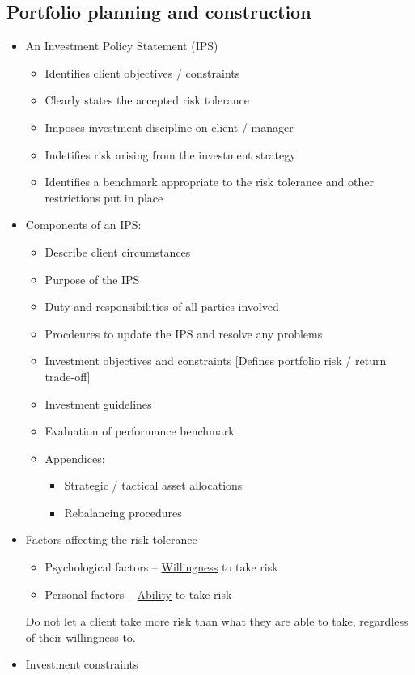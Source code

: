 \documentclass[../notes_compiled.tex]{subfiles}
\begin{document}
\subsection{Portfolio planning and construction}
\begin{itemize}
\item An Investment Policy Statement (IPS)
\begin{itemize}
\item Identifies client objectives / constraints
\item Clearly states the accepted risk tolerance
\item Imposes investment discipline on client / manager
\item Indetifies risk arising from the investment strategy
\item Identifies a benchmark appropriate to the risk tolerance and other restrictions put in place
\end{itemize}
\item Components of an IPS:
\begin{itemize}
\item Describe client circumstances
\item Purpose of the IPS
\item Duty and responsibilities of all parties involved
\item Procdeures to update the IPS and resolve any problems
\item Investment objectives and constraints [Defines portfolio risk / return trade-off]
\item Investment guidelines
\item Evaluation of performance benchmark
\item Appendices:
\begin{itemize}
\item Strategic / tactical asset allocations
\item Rebalancing procedures
\end{itemize}
\end{itemize}
\item Factors affecting the risk tolerance
\begin{itemize}
\item Psychological factors -- \underline{Willingness} to take risk
\item Personal factors -- \underline{Ability} to take risk
\end{itemize}
Do not let a client take more risk than what they are able to take, regardless of their willingness to.
\item Investment constraints

\end{itemize}
\end{document}
